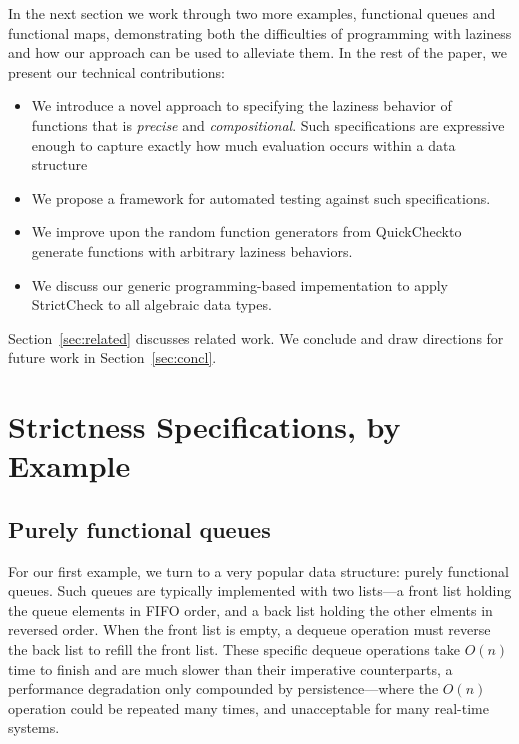 \documentclass[acmsmall,review]{acmart}\settopmatter{}
\begin{document}
In the next section we work through two more examples, functional
queues and functional maps, demonstrating both the difficulties of
programming with laziness and how our approach can be used to
alleviate them.
%
In the rest of the paper, we present our technical contributions:
\begin{itemize}
\item We introduce a novel approach to specifying the laziness behavior
of functions that is {\em precise} and {\em compositional}. Such
specifications are expressive enough to capture exactly how much
evaluation occurs within a data structure
\item We propose a framework for automated testing against such specifications.
\item We improve upon the random function generators from QuickCheck\cn to generate functions with arbitrary laziness behaviors.
\item We discuss our generic programming-based impementation to apply StrictCheck to all algebraic data types.
\end{itemize}
%
Section~\ref{sec:related} discusses related work. We conclude and draw
directions for future work in Section~\ref{sec:concl}.

\section{Strictness Specifications, by Example}
\label{sec:examples}

\subsection{Purely functional queues}
\label{sec:queues}

For our first example, we turn to a very popular data structure:
purely functional queues.  Such queues are typically implemented with
two lists---a front list holding the queue elements in FIFO order, and
a back list holding the other elments in reversed order. When the
front list is empty, a dequeue operation must reverse the back list to
refill the front list. These specific dequeue operations take $O(n)$
time to finish and are much slower than their imperative
counterparts, a performance degradation only compounded by
persistence---where the $O(n)$ operation could be repeated many times,
and unacceptable for many real-time systems.
\end{document}
